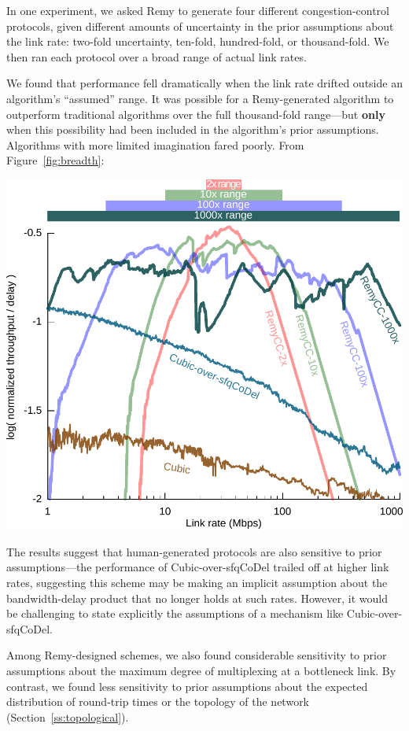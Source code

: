 In one experiment, we asked Remy to generate four different
congestion-control protocols, given different amounts of uncertainty
in the prior assumptions about the link rate: two-fold uncertainty,
ten-fold, hundred-fold, or thousand-fold. We then ran each protocol over a
broad range of actual link rates.

We found that performance fell dramatically when the link rate drifted
outside an algorithm's ``assumed'' range. It was possible for a
Remy-generated algorithm to outperform traditional algorithms over the
full thousand-fold range---but \textbf{only} when this possibility had
been included in the algorithm's prior assumptions. Algorithms with
more limited imagination fared poorly. From Figure~\ref{fig:breadth}:

\begin{center}
\includegraphics[width=0.75 \columnwidth]{oprange-manual.pdf}
\end{center}

The results suggest that human-generated protocols are also sensitive
to prior assumptions---the performance of Cubic-over-sfqCoDel trailed
off at higher link rates, suggesting this scheme may be making an implicit
assumption about the bandwidth-delay product that no longer holds at
such rates. However, it would be challenging to state explicitly the
assumptions of a mechanism like Cubic-over-sfqCoDel.

Among Remy-designed schemes, we also found considerable sensitivity to
prior assumptions about the maximum degree of multiplexing at a
bottleneck link. By contrast, we found less sensitivity to prior
assumptions about the expected distribution of round-trip times or the
topology of the network (Section~\ref{ss:topological}).

